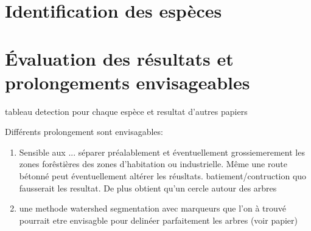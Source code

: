 \documentclass{beamer}
\begin{document}
\section{Identification des espèces}

\begin{frame}
	
\end{frame}

\section{\'{E}valuation des résultats et prolongements envisageables}

\begin{frame}
	tableau detection pour chaque espèce et resultat d'autres papiers 
\end{frame}

\begin{frame}
	Différents prolongement sont envisagables: 
	\begin{enumerate}
	\item Sensible aux ... séparer préalablement et éventuellement grossiemerement les zones forêstières des zones d'habitation ou  industrielle. Même une route bétonné peut éventuellement altérer les réusltats. batiement/contruction quo fausserait les resultat. 
	De plus obtient qu'un cercle autour des arbres
	\item une methode watershed segmentation avec marqueurs que l'on à trouvé pourrait etre envisagble pour delinéer parfaitement les arbres (voir papier) 
	\end{enumerate}
\end{frame}
\end{document}
